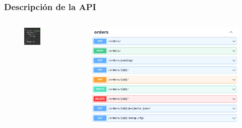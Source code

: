 \documentclass[
	11pt, %
	aspectratio=169, %
]{beamer}
\begin{document}
\begin{frame}
	\frametitle{Descripción de la API}

	\begin{columns}[c] %
		\begin{column}{0.4\textwidth} %
			\begin{figure}
				\includegraphics[width=0.7\linewidth]{order_model.png}
			\end{figure}
		\end{column}
		\begin{column}{0.6\textwidth} %
			\begin{figure}
				\includegraphics[width=\linewidth]{grimoirebots_api_orders.png}
			\end{figure}
		\end{column}
	\end{columns}
\end{frame}
\end{document}
